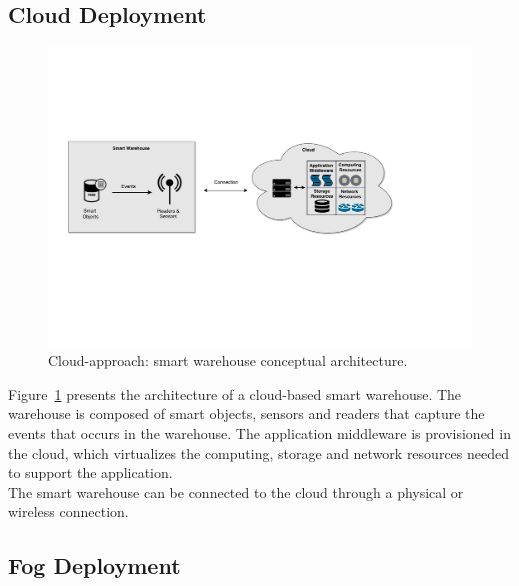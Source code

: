 \subsection{Cloud Deployment}
\label{sub:sol_cloud}

\begin{figure}[ht!]
  \centering
  \includegraphics[width=\textwidth]{./images/solution_cloud_architecture}
  \caption[Cloud-approach: conceptual architecture.]{Cloud-approach: smart warehouse conceptual architecture.}
  \label{fig:solution_cloud_architecture}
\end{figure}

Figure~\ref{fig:solution_cloud_architecture} presents the architecture of a cloud-based smart warehouse.
The warehouse is composed of smart objects, sensors and readers that capture the events that occurs
in the warehouse. The application middleware is provisioned in the cloud, which virtualizes the computing,
storage and network resources needed to support the application.\\

The smart warehouse can be connected to the cloud through a physical or wireless connection.

\subsection{Fog Deployment}
\label{sub:sol_fog}

